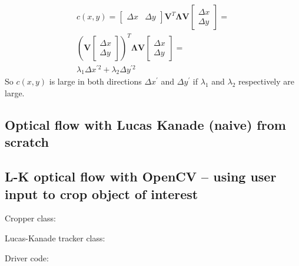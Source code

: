 \documentclass[a4paper]{article}
\begin{document}
\begin{gather*}
c(x,y) = \begin{bmatrix}\Delta x & \Delta y\end{bmatrix}\textbf{V}^T \boldsymbol{\Lambda} \textbf{V} \begin{bmatrix}\Delta x \\ \Delta y\end{bmatrix} = \\
(\textbf{V}\begin{bmatrix}\Delta x \\ \Delta y\end{bmatrix})^T\boldsymbol{\Lambda} \textbf{V}\begin{bmatrix}\Delta x \\ \Delta y\end{bmatrix} = \\
\lambda_1 \Delta x ^{\prime 2} + \lambda_2 \Delta y^{\prime 2} 
\end{gather*}
So $c(x,y)$ is large in both directions $\Delta x^\prime$ and $\Delta y^\prime$  if $\lambda_1$ and $\lambda_2$ respectively are large.




\newpage
\subsection{Optical flow with Lucas Kanade (naive) from scratch}
\label{app:lucas_kanade_scratch}



\newpage
\subsection{L-K optical flow with OpenCV -- using user input to crop object of interest}
\label{app:lucas_kanade_opencv}
Cropper class:

Lucas-Kanade tracker class:

Driver code:



\newpage
\printbibliography
\end{document}
